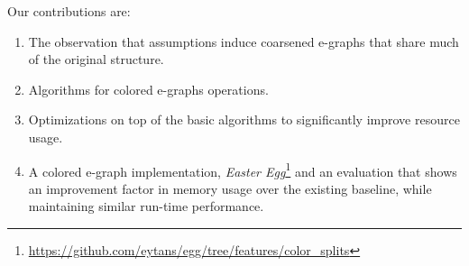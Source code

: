 \medskip
Our contributions are:
\begin{enumerate}[leftmargin=1.1em]
    \item The observation that assumptions induce coarsened e-graphs that share much of the original structure. 
    \item Algorithms for colored e-graphs operations.
    \item Optimizations on top of the basic algorithms to significantly improve resource usage.
    \item A colored e-graph implementation, \emph{Easter Egg}\footnote{\url{https://github.com/eytans/egg/tree/features/color_splits}} and an evaluation that shows an improvement factor in memory usage over the existing baseline, while maintaining similar run-time performance.
\end{enumerate}